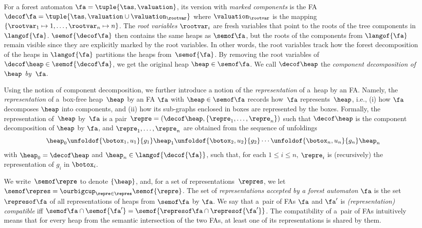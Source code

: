 For a forest automaton $\fa = \tuple{\tas,\valuation}$, its version with \emph{marked components}
is the FA 
$\decof\fa = \tuple{\tas,\valuation\cup\valuation_\rootvar}$ 
where
$\valuation_\rootvar$ is the mapping $\{\rootvar_1\mapsto
1,\ldots,\rootvar_n\mapsto n\}$.
%
The \emph{root variables} $\rootvar_i$ are fresh variables that
point to the roots of the tree components in $\langof{\fa}$. 
%
$\semof{\decof\fa}$ then contains the same heaps as $\semof\fa$, but the
roots of the components from $\langof{\fa}$ remain visible since they are explicitly marked by the root variables.
%
In other words, the root variables track how the forest decomposition of the heaps
in $\langof{\fa}$ partitions the heaps from~$\semof{\fa}$. 
%
By removing the root variables of $\decof\heap\in\semof{\decof\fa}$, we get the
original heap $\heap\in\semof\fa$. We call $\decof\heap$ the \emph{component
decomposition of $\heap$ by~$\fa$}.

Using the notion of component decomposition, we further introduce a notion of
the \emph{representation} of a~heap by an FA. Namely, the \emph{representation}
of a~box-free heap~$\heap$ by an FA $\fa$ with $\heap\in\semof\fa$ records
how~$\fa$ represents~$\heap$, i.e., (i) how $\fa$ decomposes $\heap$ into
components, and (ii) how its sub-graphs enclosed in boxes are represented by the
boxes. 
%
Formally, the representation of~$\heap$ by~$\fa$ is a pair~$\repre =
(\decof\heap,\{\repre_1,\ldots,\repre_n\})$ such that $\decof\heap$ is the
component decomposition of $\heap$ by $\fa$, and $\repre_1,\ldots,\repre_n$ are
obtained from the sequence of unfoldings\vspace*{-0.5mm}
%
\begin{equation*} 
\heap_0
\unfoldof{\botox_{1}, u_{1}}{g_{1}} 
\heap_1
\unfoldof{\botox_{2}, u_{2}}{g_{2}} 
\cdots
\unfoldof{\botox_{n}, u_{n}}{g_{n}}   
 \heap_n 
\end{equation*}
%
with $\heap_0 = \decof\heap$ and $\heap_n\in\langof{\decof{\fa}}$, such that, for
each $1\leq i\leq n$, $\repre_i$ is (recursively) the representation of $g_i$ in
$\botox_i$.

We write~$\semof\repre$ to denote $\{\heap\}$, and,
%
for a set of representations~$\repres$, we let $\semof\repres =
\ourbigcup_{\repre\in\repres} \semof{\repre}$.
%
The set of \emph{representations accepted by a forest automaton} $\fa$
is the set $\represof\fa$ of all representations of heaps from
$\semof\fa$ by $\fa$. 
%
We say that a~pair of FAs $\fa$ and $\fa'$ is \emph{(representation) compatible} iff $\semof \fa \cap
\semof {\fa'} = \semof{\represof \fa \cap \represof{\fa'}}$.
%
The compatibility of a~pair of FAs intuitively means that for every heap from the semantic intersection of the two FAs,
at least one of its representations is shared by them.
%

